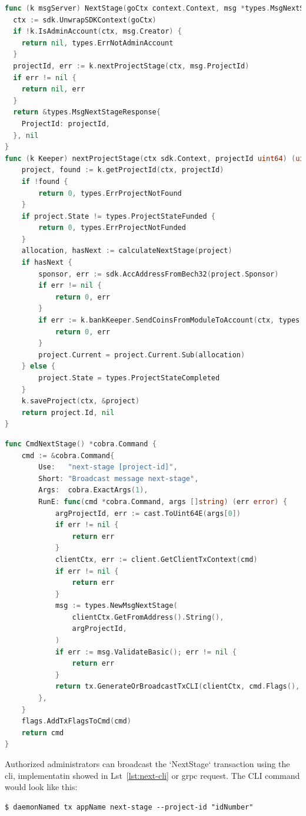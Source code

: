 \begin{lstlisting}[language=go, caption=Keeper implementation for NextStage,label={lst:next_stage_handler}]
func (k msgServer) NextStage(goCtx context.Context, msg *types.MsgNextStage) (*types.MsgNextStageResponse, error) {
  ctx := sdk.UnwrapSDKContext(goCtx)
  if !k.IsAdminAccount(ctx, msg.Creator) {
    return nil, types.ErrNotAdminAccount
  }
  projectId, err := k.nextProjectStage(ctx, msg.ProjectId)
  if err != nil {
    return nil, err
  }
  return &types.MsgNextStageResponse{
    ProjectId: projectId,
  }, nil
}
func (k Keeper) nextProjectStage(ctx sdk.Context, projectId uint64) (uint64, error) {
	project, found := k.getProjectId(ctx, projectId)
	if !found {
		return 0, types.ErrProjectNotFound
	}
	if project.State != types.ProjectStateFunded {
		return 0, types.ErrProjectNotFunded
	}
	allocation, hasNext := calculateNextStage(project)
	if hasNext {
		sponsor, err := sdk.AccAddressFromBech32(project.Sponsor)
		if err != nil {
			return 0, err
		}
		if err := k.bankKeeper.SendCoinsFromModuleToAccount(ctx, types.ModuleName, sponsor, sdk.NewCoins(allocation)); err != nil {
			return 0, err
		}
		project.Current = project.Current.Sub(allocation)
	} else {
		project.State = types.ProjectStateCompleted
	}
	k.saveProject(ctx, &project)
	return project.Id, nil
}
\end{lstlisting}

\begin{lstlisting}[language=go, caption=Next Stage CLI Definition,label={lst:next-cli}]
func CmdNextStage() *cobra.Command {
	cmd := &cobra.Command{
		Use:   "next-stage [project-id]",
		Short: "Broadcast message next-stage",
		Args:  cobra.ExactArgs(1),
		RunE: func(cmd *cobra.Command, args []string) (err error) {
			argProjectId, err := cast.ToUint64E(args[0])
			if err != nil {
				return err
			}
			clientCtx, err := client.GetClientTxContext(cmd)
			if err != nil {
				return err
			}
			msg := types.NewMsgNextStage(
				clientCtx.GetFromAddress().String(),
				argProjectId,
			)
			if err := msg.ValidateBasic(); err != nil {
				return err
			}
			return tx.GenerateOrBroadcastTxCLI(clientCtx, cmd.Flags(), msg)
		},
	}
	flags.AddTxFlagsToCmd(cmd)
	return cmd
}
\end{lstlisting}

Authorized administrators can broadcast the `NextStage` transaction using the \gls{cli}, implementatin showed in Lst~\ref{lst:next-cli} or \gls{grpc} request. The CLI command would look like this:

\begin{verbatim}
$ daemonNamed tx appName next-stage --project-id "idNumber"
\end{verbatim}

